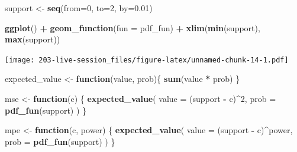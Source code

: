 \documentclass[
]{book}
\newenvironment{Shaded}{\begin{snugshade}}{\end{snugshade}}
\newcommand{\AttributeTok}[1]{\textcolor[rgb]{0.13,0.29,0.53}{#1}}
\newcommand{\ControlFlowTok}[1]{\textcolor[rgb]{0.13,0.29,0.53}{\textbf{#1}}}
\newcommand{\DecValTok}[1]{\textcolor[rgb]{0.00,0.00,0.81}{#1}}
\newcommand{\FloatTok}[1]{\textcolor[rgb]{0.00,0.00,0.81}{#1}}
\newcommand{\FunctionTok}[1]{\textcolor[rgb]{0.13,0.29,0.53}{\textbf{#1}}}
\newcommand{\NormalTok}[1]{#1}
\newcommand{\OtherTok}[1]{\textcolor[rgb]{0.56,0.35,0.01}{#1}}
\newcommand{\SpecialCharTok}[1]{\textcolor[rgb]{0.81,0.36,0.00}{\textbf{#1}}}
\theoremstyle{definition}
\theoremstyle{definition}
\theoremstyle{definition}
\theoremstyle{definition}
\theoremstyle{remark}
\begin{document}
\begin{Shaded}
\begin{Highlighting}[]
\NormalTok{support }\OtherTok{\textless{}{-}} \FunctionTok{seq}\NormalTok{(}\AttributeTok{from=}\DecValTok{0}\NormalTok{, }\AttributeTok{to=}\DecValTok{2}\NormalTok{, }\AttributeTok{by=}\FloatTok{0.01}\NormalTok{)}
\end{Highlighting}
\end{Shaded}

\begin{Shaded}
\begin{Highlighting}[]
\FunctionTok{ggplot}\NormalTok{() }\SpecialCharTok{+} 
  \FunctionTok{geom\_function}\NormalTok{(}\AttributeTok{fun =}\NormalTok{ pdf\_fun) }\SpecialCharTok{+} 
  \FunctionTok{xlim}\NormalTok{(}\FunctionTok{min}\NormalTok{(support), }\FunctionTok{max}\NormalTok{(support))}
\end{Highlighting}
\end{Shaded}

\texttt{[image: 203-live-session\_files/figure-latex/unnamed-chunk-14-1.pdf]}

\begin{Shaded}
\begin{Highlighting}[]
\NormalTok{expected\_value }\OtherTok{\textless{}{-}} \ControlFlowTok{function}\NormalTok{(value, prob)\{}
  \FunctionTok{sum}\NormalTok{(value }\SpecialCharTok{*}\NormalTok{ prob)}
\NormalTok{\}}

\NormalTok{mse }\OtherTok{\textless{}{-}} \ControlFlowTok{function}\NormalTok{(c) \{ }
  \FunctionTok{expected\_value}\NormalTok{(}
    \AttributeTok{value =}\NormalTok{ (support }\SpecialCharTok{{-}}\NormalTok{ c)}\SpecialCharTok{\^{}}\DecValTok{2}\NormalTok{, }
    \AttributeTok{prob  =} \FunctionTok{pdf\_fun}\NormalTok{(support)}
\NormalTok{  )  }
\NormalTok{\}}

\NormalTok{mpe }\OtherTok{\textless{}{-}} \ControlFlowTok{function}\NormalTok{(c, power) \{ }
  \FunctionTok{expected\_value}\NormalTok{(}
    \AttributeTok{value =}\NormalTok{ (support }\SpecialCharTok{{-}}\NormalTok{ c)}\SpecialCharTok{\^{}}\NormalTok{power, }
    \AttributeTok{prob  =} \FunctionTok{pdf\_fun}\NormalTok{(support)}
\NormalTok{  )}
\NormalTok{\}}
\end{Highlighting}
\end{Shaded}
\end{document}
